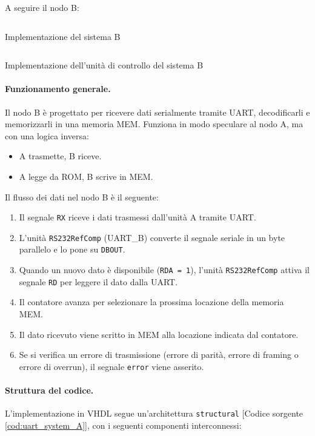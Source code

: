 A seguire il nodo B:

\begin{code}
    \inputminted{vhdl}{vhdl/uart_system_B.vhd}
    \caption{Implementazione del sistema B}
    \label{cod:uart_system_B}
\end{code}

\begin{code}
    \inputminted{vhdl}{vhdl/uart_control_unit_B.vhd}
    \caption{Implementazione dell'unità di controllo del sistema B}
    \label{cod:uart_control_unit_B}
\end{code}

\paragraph{Funzionamento generale.}
Il nodo B è progettato per ricevere dati serialmente tramite UART, decodificarli e memorizzarli in una memoria MEM. Funziona in modo speculare al nodo A, ma con una logica inversa:

\begin{itemize}
    \item A trasmette, B riceve.
    \item A legge da ROM, B scrive in MEM.
\end{itemize}

Il flusso dei dati nel nodo B è il seguente:

\begin{enumerate}
    \item Il segnale \texttt{RX} riceve i dati trasmessi dall'unità A tramite UART.
    \item L'unità \texttt{RS232RefComp} (UART\_B) converte il segnale seriale in un byte parallelo e lo pone su \texttt{DBOUT}.
    \item Quando un nuovo dato è disponibile (\texttt{RDA = 1}), l'unità \texttt{RS232RefComp} attiva il segnale \texttt{RD} per leggere il dato dalla UART.
    \item Il contatore avanza per selezionare la prossima locazione della memoria MEM.
    \item Il dato ricevuto viene scritto in MEM alla locazione indicata dal contatore.
    \item Se si verifica un errore di trasmissione (errore di parità, errore di framing o errore di overrun), il segnale \texttt{error} viene asserito.
\end{enumerate}

\paragraph{Struttura del codice.}
L'implementazione in VHDL segue un'architettura \texttt{structural} [Codice sorgente \ref{cod:uart_system_A}], con i seguenti componenti interconnessi:


